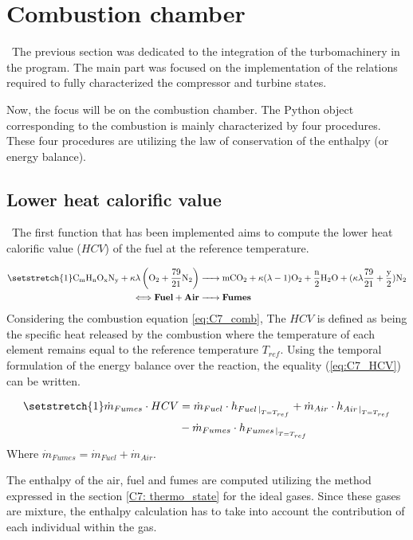 \section{Combustion chamber}
\quad\ The previous section was dedicated to the integration of the turbomachinery in the program. The main part was focused on the implementation of the relations required to fully characterized the compressor and turbine states.

Now, the focus will be on the combustion chamber. The Python object corresponding to the combustion is mainly characterized by four procedures. These four procedures are utilizing the law of conservation of the enthalpy (or energy balance).

\subsection{Lower heat calorific value}
\quad\ The first function that has been implemented aims to compute the lower heat calorific value ($HCV$) of the fuel at the reference temperature. 

\begin{align}
    \setstretch{1}
    \ce{C_{\text{m}}H_{\text{n}}O_{\text{x}}N_{\text{y}} +}\kappa\lambda \left(\ce{O2}+\frac{79}{21}\ce{N2}\right) &\ce{-> mCO2 +} \kappa(\lambda-1)\ce{O2 + \frac{n}{2}H2O +} (\kappa\lambda\frac{79}{21} + \frac{\text{y}}{2})\ce{N2} \label{eq:C7_comb}\\
    \Longleftrightarrow \textbf{Fuel} + \textbf{Air} &\ce{->} \textbf{Fumes}\nonumber
\end{align}
Considering the combustion equation \ref{eq:C7_comb}, The $HCV$ is defined as being the specific heat released by the combustion where the temperature of each element remains equal to the reference temperature $T_{ref}$. Using the temporal formulation of the energy balance over the reaction, the equality (\ref{eq:C7_HCV}) can be written.

\begin{align}
    \setstretch{1}
    \dot{m}_{Fumes}\cdot HCV &= \dot{m}_{Fuel}\cdot h_{Fuel\left.\right|_{T=T_{ref}}} + \dot{m}_{Air}\cdot h_{Air\left.\right|_{T=T_{ref}}}\nonumber\\
    &- \dot{m}_{Fumes}\cdot h_{Fumes\left.\right|_{T=T_{ref}}}\label{eq:C7_HCV}
\end{align}
Where $\dot{m}_{Fumes} = \dot{m}_{Fuel} + \dot{m}_{Air}$.

The enthalpy of the air, fuel and fumes are computed utilizing the method expressed in the section \ref{C7: thermo_state} for the ideal gases. Since these gases are mixture, the enthalpy calculation has to take into account the contribution of each individual within the gas.

